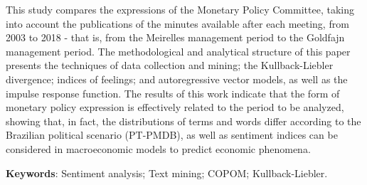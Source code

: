 \begin{resumo}[ABSTRACT] %
	
This study compares the expressions of the Monetary Policy Committee, taking into account the publications of the minutes available after each meeting, from 2003 to 2018 - that is, from the Meirelles management period to the Goldfajn management period. The methodological and analytical structure of this paper presents the techniques of data collection and mining; the Kullback-Liebler divergence; indices of feelings; and autoregressive vector models, as well as the impulse response function. The results of this work indicate that the form of monetary policy expression is effectively related to the period to be analyzed, showing that, in fact, the distributions of terms and words differ according to the Brazilian political scenario (PT-PMDB), as well as sentiment indices can be considered in macroeconomic models to predict economic phenomena.

\textbf{Keywords}: Sentiment analysis; Text mining; COPOM; Kullback-Liebler. 	
\end{resumo}



